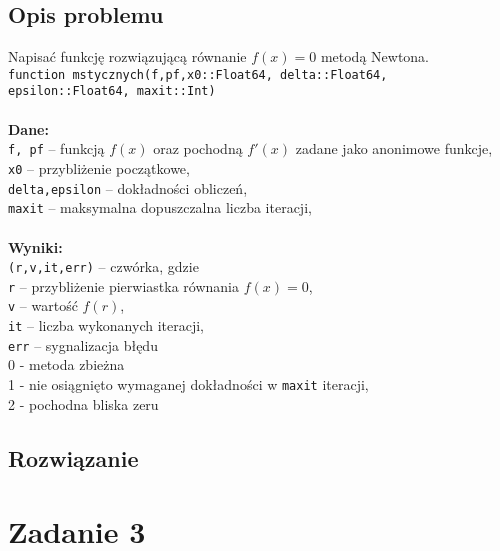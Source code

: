 \documentclass[a4paper]{article}
\newcommand\tab[1][1cm]{\hspace*{#1}}
\begin{document}
    \subsection{Opis problemu}
    Napisać funkcję rozwiązującą równanie $f(x) = 0$ metodą Newtona. \\
    \texttt{function mstycznych(f,pf,x0::Float64, delta::Float64, epsilon::Float64, maxit::Int)}
    \\\\
    \textbf{Dane:}\\
    \texttt{f, pf} – funkcją $f(x)$ oraz pochodną $f'(x)$ zadane jako anonimowe funkcje, \\
    \texttt{x0} – przybliżenie początkowe, \\
    \texttt{delta,epsilon} – dokładności obliczeń, \\
    \texttt{maxit} – maksymalna dopuszczalna liczba iteracji, \\\\
    \textbf{Wyniki:}\\
    \texttt{(r,v,it,err)} – czwórka, gdzie \\
    \tab \texttt{r} – przybliżenie pierwiastka równania $f(x) = 0$, \\
    \tab \texttt{v} – wartość $f(r)$, \\
    \tab \texttt{it} – liczba wykonanych iteracji, \\
    \tab \texttt{err} – sygnalizacja błędu\\
    \tab \tab 0 - metoda zbieżna \\
    \tab \tab 1 - nie osiągnięto wymaganej dokładności w \texttt{maxit} iteracji, \\
    \tab \tab 2 - pochodna bliska zeru \\
    
    \subsection{Rozwiązanie}

\section{Zadanie 3}
\end{document}
